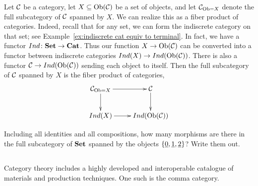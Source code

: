 \documentclass[CT4S-EN-RU]{subfiles}
\begin{document}
\begin{remarkRUS}
\end{remarkRUS}

\begin{exampleENG}
Let $\mathcal{C}$ be a category, let $X\subseteq\textnormal{Ob}(\mathcal{C})$ be a set of objects, and let $\mathcal{C}_{\textnormal{Ob}=X}$ denote the full subcategory of $\mathcal{C}$ spanned by $X$. We can realize this as a fiber product of categories. Indeed, recall that for any set, we can form the indiscrete category on that set; see Example~\ref{ex:indiscrete cat equiv to terminal}. In fact, we have a functor $Ind\colon{\mathbf{Set}}\rightarrow{\mathbf{Cat}}$. Thus our function $X\rightarrow\textnormal{Ob}(\mathcal{C})$ can be converted into a functor between indiscrete categories $Ind(X)\rightarrow Ind(\textnormal{Ob}(\mathcal{C}))$. There is also a functor $\mathcal{C}\rightarrow Ind(\textnormal{Ob}(\mathcal{C}))$ sending each object to itself. Then the full subcategory of $\mathcal{C}$ spanned by $X$ is the fiber product of categories,
$$\xymatrix{\mcC_{\Ob=X}\ar[r]\ar[d]&\mcC\ar[d]\\Ind(X)\ar[r]&Ind(\Ob(\mcC))}$$
\end{exampleENG}

\begin{exampleRUS}
\end{exampleRUS}

\begin{exerciseENG}
Including all identities and all compositions, how many morphisms are there in the full subcategory of ${\mathbf{Set}}$ spanned by the objects $\{\underline{0},\underline{1},\underline{2}\}$? Write them out.
\end{exerciseENG}

\begin{exerciseRUS}
\end{exerciseRUS}


\subsection{}\label{sec:comma}

\begin{blockENG}
Category theory includes a highly developed and interoperable catalogue of materials and production techniques. One such is the comma category.
\end{blockENG}

\begin{blockRUS}
\end{blockRUS}
\end{document}
